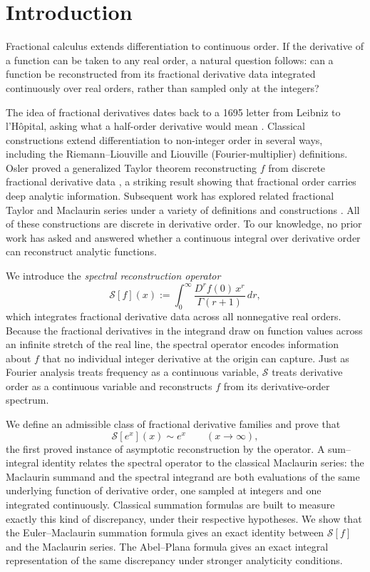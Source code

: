 \documentclass[preprint, 12pt]{elsarticle}
\theoremstyle{definition}
\theoremstyle{plain}
\theoremstyle{remark}
\begin{document}
\section{Introduction}
Fractional calculus extends differentiation to continuous order. If the derivative of a function can be taken to any real order, a natural question follows: can a function be reconstructed from its fractional derivative data integrated continuously over real orders, rather than sampled only at the integers?

The idea of fractional derivatives dates back to a 1695 letter from Leibniz to l'Hôpital, asking what a half-order derivative would mean \cite{Ross1977}. Classical constructions extend differentiation to non-integer order in several ways, including the Riemann--Liouville and Liouville (Fourier-multiplier) \cite{Weyl1917} definitions. Osler proved a generalized Taylor theorem reconstructing $f$ from discrete fractional derivative data \cite{Osler1971}, a striking result showing that fractional order carries deep analytic information. Subsequent work has explored related fractional Taylor and Maclaurin series under a variety of definitions and constructions \cite{Alquran2023, FernandezBaleanu2018, Gladkina2017, Wei2020, ZitaneTorres2023}. All of these constructions are discrete in derivative order. To our knowledge, no prior work has asked and answered whether a continuous integral over derivative order can reconstruct analytic functions.

We introduce the \textit{spectral reconstruction operator}
\begin{equation}
\mathcal{S}[f](x)
:=
\int_0^\infty
\frac{D^r f(0)\,x^r}{\Gamma(r+1)}
\,dr,
\end{equation}
which integrates fractional derivative data across all nonnegative real orders. Because the fractional derivatives in the integrand draw on function values across an infinite stretch of the real line, the spectral operator encodes information about $f$ that no individual integer derivative at the origin can capture. Just as Fourier analysis treats frequency as a continuous variable, $\mathcal{S}$ treats derivative order as a continuous variable and reconstructs $f$ from its derivative-order spectrum.

We define an admissible class of fractional derivative families and prove that
\[
\mathcal S[e^x](x)\sim e^x \qquad (x\to\infty),
\]
the first proved instance of asymptotic reconstruction by the operator. A sum--integral identity relates the spectral operator to the classical Maclaurin series: the Maclaurin summand and the spectral integrand are both evaluations of the same underlying function of derivative order, one sampled at integers and one integrated continuously. Classical summation formulas are built to measure exactly this kind of discrepancy, under their respective hypotheses. We show that the Euler--Maclaurin summation formula gives an exact identity between $\mathcal{S}[f]$ and the Maclaurin series. The Abel--Plana formula gives an exact integral representation of the same discrepancy under stronger analyticity conditions.
\end{document}
